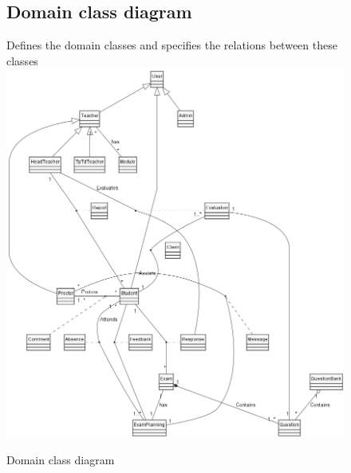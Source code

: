 \documentclass[]{uc2pfecaneva}
\begin{document}
    \begin{figure}
        \subsection{Domain class diagram}
        \raggedright Defines the domain classes and specifies the relations between these classes
        \linebreak
        \includegraphics[width=\textwidth]{images/DCD}
        \caption{Domain class diagram}
    \end{figure}
\end{document}
